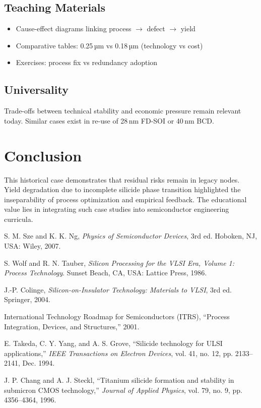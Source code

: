 \documentclass[conference]{IEEEtran}
\begin{document}
\subsection{Teaching Materials}
\begin{itemize}
  \item Cause-effect diagrams linking process $\rightarrow$ defect $\rightarrow$ yield
  \item Comparative tables: 0.25\,µm vs 0.18\,µm (technology vs cost)
  \item Exercises: process fix vs redundancy adoption
\end{itemize}

\subsection{Universality}
Trade-offs between technical stability and economic pressure remain relevant today. 
Similar cases exist in re-use of 28\,nm FD-SOI or 40\,nm BCD. 

\section{Conclusion}
This historical case demonstrates that residual risks remain in legacy nodes. 
Yield degradation due to incomplete silicide phase transition highlighted the inseparability of process optimization and empirical feedback. 
The educational value lies in integrating such case studies into semiconductor engineering curricula.

\begin{thebibliography}{99}

S. M. Sze and K. K. Ng, \emph{Physics of Semiconductor Devices}, 3rd ed. Hoboken, NJ, USA: Wiley, 2007.

S. Wolf and R. N. Tauber, \emph{Silicon Processing for the VLSI Era, Volume 1: Process Technology}. Sunset Beach, CA, USA: Lattice Press, 1986.

J.-P. Colinge, \emph{Silicon-on-Insulator Technology: Materials to VLSI}, 3rd ed. Springer, 2004.

International Technology Roadmap for Semiconductors (ITRS), ``Process Integration, Devices, and Structures,'' 2001.

E. Takeda, C. Y. Yang, and A. S. Grove, ``Silicide technology for ULSI applications,'' \emph{IEEE Transactions on Electron Devices}, vol. 41, no. 12, pp. 2133--2141, Dec. 1994.

J. P. Chang and A. J. Steckl, ``Titanium silicide formation and stability in submicron CMOS technology,'' \emph{Journal of Applied Physics}, vol. 79, no. 9, pp. 4356--4364, 1996.

\end{thebibliography}
\end{document}
